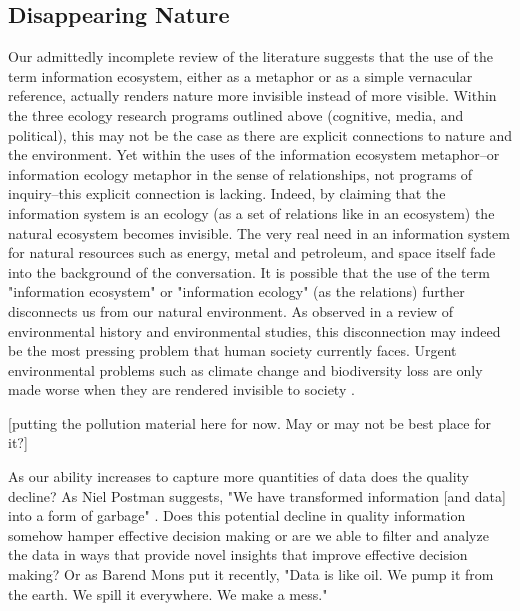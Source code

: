 \subsection{Disappearing Nature}

Our admittedly incomplete review of the literature suggests that the use of the term information ecosystem, either as a metaphor or as a simple vernacular reference, actually renders nature more invisible instead of more visible. Within the three ecology research programs outlined above (cognitive, media, and political), this may not be the case as there are explicit connections to nature and the environment. Yet within the uses of the information ecosystem metaphor--or information ecology metaphor in the sense of relationships, not programs of inquiry--this explicit connection is lacking. Indeed, by claiming that the information system is an ecology (as a set of relations like in an ecosystem) the natural ecosystem becomes invisible. The very real need in an information system for natural resources such as energy, metal and petroleum, and space itself fade into the background of the conversation. It is possible that the use of the term "information ecosystem" or "information ecology" (as the relations) further disconnects us from our natural environment.  As observed in a review of environmental history and environmental studies, this disconnection may indeed be the most pressing problem that human society currently faces. Urgent environmental problems such as climate change and biodiversity loss are only made worse when they are rendered invisible to society \citep{worthy_2013}.

[putting the pollution material here for now. May or may not be best place for it?]

As our ability increases to capture more quantities of data does the quality decline? As Niel Postman suggests, "We have transformed information [and data] into a form of garbage" \citep[cited in][p. 50]{stepp_1999}. Does this potential decline in quality information somehow hamper effective decision making or are we able to filter and analyze the data in ways that provide novel insights that improve effective decision making? Or as Barend Mons put it recently, "Data is like oil. We pump it from the earth. We spill it everywhere. We make a mess." \citep{mons_2016}